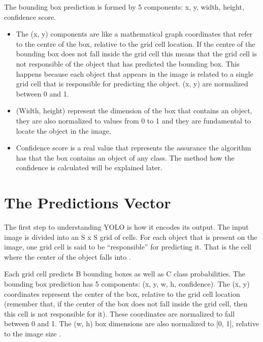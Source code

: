 The bounding box prediction is formed by 5 components: x, y, width,
height, confidence score.

\begin{itemize}
\item The (x, y) components are like a mathematical graph coordinates that
refer to the centre of the box, relative to the grid cell location. If the
centre of the bounding box does not fall inside the grid cell this means
that the grid cell is not responsible of the object that has predicted the
bounding box. This happens because each object that appears in the image is related to a single grid cell that is responsible for predicting the
object. (x, y) are normalized between 0 and 1.

\item (Width, height) represent the dimension of the box that contains an object,
they are also normalized to values from 0 to 1 and they are fundamental
to locate the object in the image.

\item Confidence score is a real value that represents the assurance the algorithm has that the box contains an object of any class. The method how
the confidence is calculated will be explained later.

\end{itemize}


\section{The Predictions Vector}
The first step to understanding YOLO is how it encodes its output. The input image is divided into an S x S grid of cells. For each object that is present on the image, one grid cell is said to be “responsible” for predicting it. That is the cell where the center of the object falls into \cite{redmon2016look}.

Each grid cell predicts B bounding boxes as well as C class probabilities. The bounding box prediction has 5 components: (x, y, w, h, confidence). The (x, y) coordinates represent the center of the box, relative to the grid cell location (remember that, if the center of the box does not fall inside the grid cell, then this cell is not responsible for it). These coordinates are normalized to fall between 0 and 1. The (w, h) box dimensions are also normalized to [0, 1], relative to the image size \cite{redmon2016look}.

